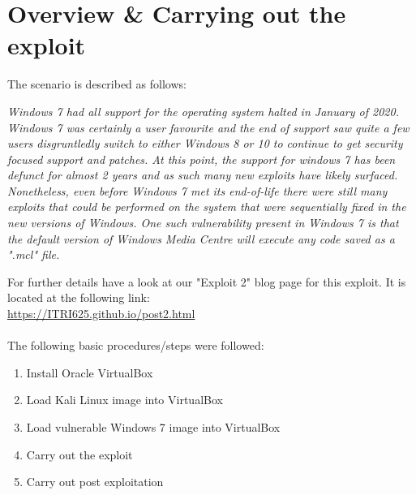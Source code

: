 \documentclass[a4paper, 12pt, titlepage]{report}
\begin{document}
\section{Overview \& Carrying out the exploit}
The scenario is described as follows:
\begin{displayquote}
\textit{Windows 7 had all support for the operating system halted in January of 2020. Windows 7 was certainly a user favourite and the end of support saw quite a few users disgruntledly switch to either Windows 8 or 10 to continue to get security focused support and patches. At this point, the support for windows 7 has been defunct for almost 2 years and as such many new exploits have likely surfaced. Nonetheless, even before Windows 7 met its end-of-life there were still many exploits that could be performed on the system that were sequentially fixed in the new versions of Windows. One such vulnerability present in Windows 7 is that the default version of Windows Media Centre will execute any code saved as a ".mcl" file.}
\end{displayquote}
For further details have a look at our "Exploit 2" blog page for this exploit. It is located at the following link:\\
\url{https://ITRI625.github.io/post2.html}
\\\\
The following basic procedures/steps were followed:
\begin{enumerate}
    \item Install Oracle VirtualBox
    \item Load Kali Linux image into VirtualBox
    \item Load vulnerable Windows 7 image into VirtualBox
    \item Carry out the exploit
    \item Carry out post exploitation
\end{enumerate}
\end{document}
